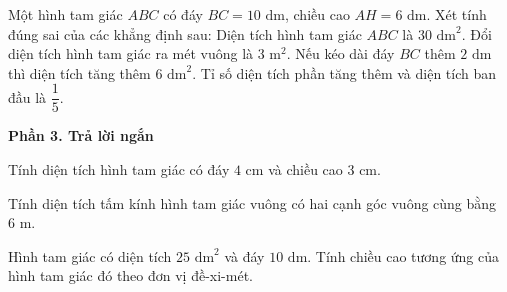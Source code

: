 \begin{ex} %
Một hình tam giác $ABC$ có đáy $BC = 10\text{ dm}$, chiều cao $AH = 6\text{ dm}$. Xét tính đúng sai của các khẳng định sau:
\choiceTF
{\True Diện tích hình tam giác $ABC$ là $30\text{ dm}^2$.}
{Đổi diện tích hình tam giác ra mét vuông là $3\text{ m}^2$.}
{\True Nếu kéo dài đáy $BC$ thêm $2\text{ dm}$ thì diện tích tăng thêm $6\text{ dm}^2$.}
{\True Tỉ số diện tích phần tăng thêm và diện tích ban đầu là $\dfrac{1}{5}$.}
\end{ex}

\textbf{Phần 3. Trả lời ngắn}

\begin{ex} %
Tính diện tích hình tam giác có đáy $4\text{ cm}$ và chiều cao $3\text{ cm}$.
\end{ex}

\begin{ex} %
Tính diện tích tấm kính hình tam giác vuông có hai cạnh góc vuông cùng bằng $6\text{ m}$.
\end{ex}

\begin{ex} %
Hình tam giác có diện tích $25\text{ dm}^2$ và đáy $10\text{ dm}$. Tính chiều cao tương ứng của hình tam giác đó theo đơn vị đề-xi-mét.
\end{ex}

